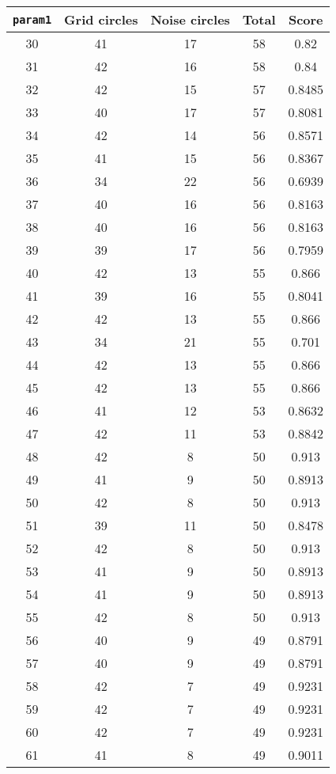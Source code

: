 \documentclass[letterpaper, 12pt]{article}
\begin{document}
\begin{longtable}{|c|c|c|c|c|}
\hline
\textbf{\texttt{param1}} & \textbf{Grid circles} & \textbf{Noise circles} & \textbf{Total} & \textbf{Score} \\
\hline
30 & 41 & 17 & 58 & 0.82 \\
\hline
31 & 42 & 16 & 58 & 0.84 \\
\hline
32 & 42 & 15 & 57 & 0.8485 \\
\hline
33 & 40 & 17 & 57 & 0.8081 \\
\hline
34 & 42 & 14 & 56 & 0.8571 \\
\hline
35 & 41 & 15 & 56 & 0.8367 \\
\hline
36 & 34 & 22 & 56 & 0.6939 \\
\hline
37 & 40 & 16 & 56 & 0.8163 \\
\hline
38 & 40 & 16 & 56 & 0.8163 \\
\hline
39 & 39 & 17 & 56 & 0.7959 \\
\hline
40 & 42 & 13 & 55 & 0.866 \\
\hline
41 & 39 & 16 & 55 & 0.8041 \\
\hline
42 & 42 & 13 & 55 & 0.866 \\
\hline
43 & 34 & 21 & 55 & 0.701 \\
\hline
44 & 42 & 13 & 55 & 0.866 \\
\hline
45 & 42 & 13 & 55 & 0.866 \\
\hline
46 & 41 & 12 & 53 & 0.8632 \\
\hline
47 & 42 & 11 & 53 & 0.8842 \\
\hline
48 & 42 & 8 & 50 & 0.913 \\
\hline
49 & 41 & 9 & 50 & 0.8913 \\
\hline
50 & 42 & 8 & 50 & 0.913 \\
\hline
51 & 39 & 11 & 50 & 0.8478 \\
\hline
52 & 42 & 8 & 50 & 0.913 \\
\hline
53 & 41 & 9 & 50 & 0.8913 \\
\hline
54 & 41 & 9 & 50 & 0.8913 \\
\hline
55 & 42 & 8 & 50 & 0.913 \\
\hline
56 & 40 & 9 & 49 & 0.8791 \\
\hline
57 & 40 & 9 & 49 & 0.8791 \\
\hline
58 & 42 & 7 & 49 & 0.9231 \\
\hline
59 & 42 & 7 & 49 & 0.9231 \\
\hline
60 & 42 & 7 & 49 & 0.9231 \\
\hline
61 & 41 & 8 & 49 & 0.9011 \\

\end{longtable}
\end{document}

